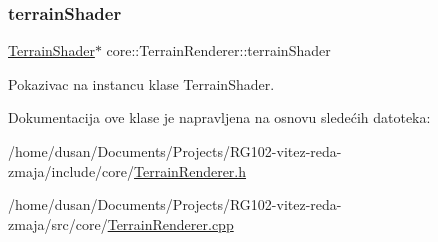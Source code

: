 \subsubsection{\texorpdfstring{terrain\+Shader}{terrainShader}}
{\footnotesize\ttfamily \hyperlink{classshader_1_1TerrainShader}{Terrain\+Shader}$\ast$ core\+::\+Terrain\+Renderer\+::terrain\+Shader\hspace{0.3cm}{\ttfamily [private]}}



Pokazivac na instancu klase Terrain\+Shader. 



Dokumentacija ove klase je napravljena na osnovu sledećih datoteka\+:\begin{DoxyCompactItemize}
\item 
/home/dusan/\+Documents/\+Projects/\+R\+G102-\/vitez-\/reda-\/zmaja/include/core/\hyperlink{TerrainRenderer_8h}{Terrain\+Renderer.\+h}\item 
/home/dusan/\+Documents/\+Projects/\+R\+G102-\/vitez-\/reda-\/zmaja/src/core/\hyperlink{TerrainRenderer_8cpp}{Terrain\+Renderer.\+cpp}\end{DoxyCompactItemize}
